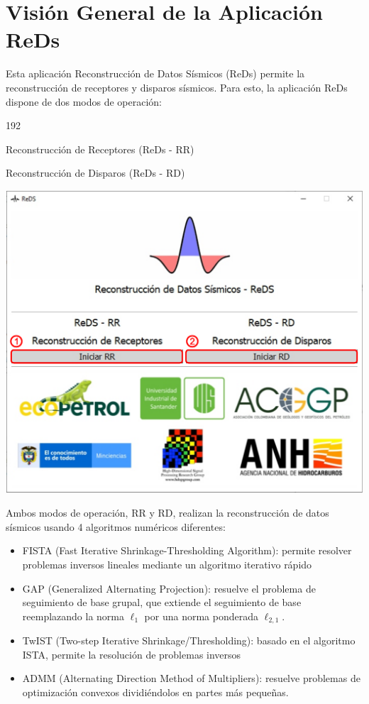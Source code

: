 \documentclass[12pt,twoside,letter]{ol-softwaremanual}
\newenvironment{Figure}
  {\par\medskip\noindent\minipage{\linewidth}}
  {\endminipage\par\medskip}
\begin{document}
\newpage\null\thispagestyle{empty}\newpage

\clearpage
\tableofcontents

\clearpage

\newpage\null\thispagestyle{empty}\newpage

\section{Visión General de la Aplicación ReDs}

Esta aplicación Reconstrucción de Datos Sísmicos (ReDs) permite la reconstrucción de receptores y disparos sísmicos. Para esto, la aplicación ReDs dispone de dos modos de operación:
\begin{dingautolist}{192}
	\setlength\itemsep{0em}
	\item Reconstrucción de Receptores (ReDs - RR)
	\item Reconstrucción de Disparos (ReDs - RD)
\end{dingautolist}

\begin{Figure}
	\centering
	\includegraphics[width=0.65\linewidth]{launch2}
	\label{fig:launch}
\end{Figure}

Ambos modos de operación, RR y RD, realizan la reconstrucción de datos sísmicos usando 4 algoritmos numéricos diferentes:
\begin{itemize}[leftmargin=0.5in]
	\setlength\itemsep{0em}
	\item FISTA (Fast Iterative Shrinkage-Thresholding Algorithm): permite resolver problemas inversos lineales mediante un algoritmo iterativo rápido
	\item GAP (Generalized Alternating Projection): resuelve el problema de seguimiento de base grupal, que extiende el seguimiento de base reemplazando la norma $ \ell_1 $ por una norma ponderada $ \ell_{2,1} $.
	\item TwIST (Two-step Iterative Shrinkage/Thresholding): basado en el algoritmo ISTA, permite la resolución de problemas inversos
	\item ADMM (Alternating Direction Method of Multipliers): resuelve problemas de optimización convexos dividiéndolos en partes más pequeñas.
\end{itemize}
\end{document}
